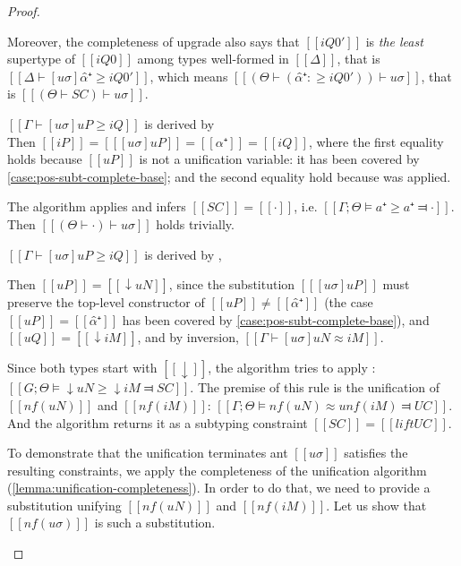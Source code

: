 \begin{proof}
\begin{caseof}
            Moreover, the completeness of upgrade also says that $[[iQ0']]$ is 
            \emph{the least} supertype of $[[iQ0]]$ among types well-formed in $[[Δ]]$, 
            that is $[[Δ ⊢ [uσ]α̂⁺ ≥ iQ0']]$, which means 
            $[[(Θ  ⊢  (α̂⁺ :≥ iQ0')) ⊢ uσ]]$, that is $[[(Θ  ⊢  SC) ⊢ uσ]]$.

        \item \label{case:pos-subt-complete-pvar}
        $[[ Γ ⊢ [uσ]uP ≥ iQ ]]$ is derived by \\
        Then $[[iP]] = [[ [uσ]uP ]] = [[ α⁺ ]] = [[iQ]]$, where
        the first equality holds because $[[uP]]$ is not a unification variable:
        it has been covered by \cref{case:pos-subt-complete-base}; and
        the second equality hold because  was applied.

        The algorithm applies  and 
        infers $[[SC]] = [[·]]$, i.e. $[[Γ;Θ ⊨ a⁺ ≥ a⁺ ⫤ ·]]$.
        Then $[[(Θ  ⊢  ·) ⊢ uσ]]$ holds trivially.


        \item \label{case:pos-subt-complete-upshift} $[[ Γ ⊢ [uσ]uP ≥ iQ ]]$ 
        is derived by ,
        
        Then $[[ uP ]] = [[ ↓uN ]]$, since the substitution $[[ [uσ]uP ]]$ must preserve the 
        top-level constructor of $[[uP]]\neq [[α̂⁺]]$ (the case $[[uP]] = [[α̂⁺]]$ has been covered
        by \cref{case:pos-subt-complete-base}), and $[[uQ]] = [[ ↓iM ]]$,
        and by inversion, $[[ Γ ⊢ [uσ]uN ≈ iM ]]$.

        Since both types start with $[[↓]]$, 
        the algorithm tries to apply : 
        $[[G;Θ ⊨ ↓uN ≥ ↓iM ⫤ SC]]$. The premise of this rule is the
        unification of $[[nf(uN)]]$ and $[[nf(iM)]]$:
        $[[Γ;Θ ⊨ nf(uN) ≈u nf(iM) ⫤ UC]]$. And the algorithm 
        returns it as a subtyping constraint $[[SC]] = [[lift UC]]$.


        To demonstrate that the unification terminates
        ant $[[uσ]]$ satisfies the resulting constraints, 
        we apply the completeness 
        of the unification algorithm (\cref{lemma:unification-completeness}). 
        In order to do that, we need to provide a substitution unifying  
        $[[nf(uN)]]$ and $[[nf(iM)]]$. 
        Let us show that $[[nf(uσ)]]$ is such a substitution. 


\end{caseof}
\end{proof}
